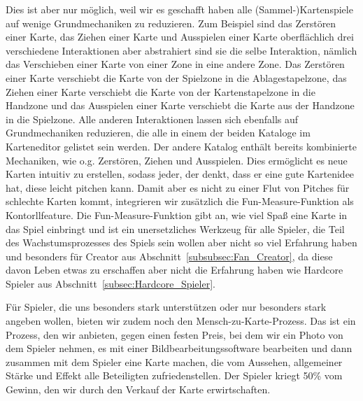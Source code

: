 \documentclass[fontsize=11, a4aper]{scrartcl}
\begin{document}
\noindent Dies ist aber nur möglich, weil wir es geschafft haben alle (Sammel-)Kartenspiele auf wenige Grundmechaniken zu reduzieren. Zum Beispiel sind das Zerstören einer Karte, das Ziehen einer Karte und Ausspielen einer Karte oberflächlich drei verschiedene Interaktionen aber abstrahiert sind sie die selbe Interaktion, nämlich das Verschieben einer Karte von einer Zone in eine andere Zone. Das Zerstören einer Karte verschiebt die Karte von der Spielzone in die Ablagestapelzone, das Ziehen einer Karte verschiebt die Karte von der Kartenstapelzone in die Handzone und das Ausspielen einer Karte verschiebt die Karte aus der Handzone in die Spielzone. Alle anderen Interaktionen lassen sich ebenfalls auf Grundmechaniken reduzieren, die alle in einem der beiden Kataloge im Karteneditor gelistet sein werden. Der andere Katalog enthält bereits kombinierte Mechaniken, wie o.g. Zerstören, Ziehen und Ausspielen. Dies ermöglicht es neue Karten intuitiv zu erstellen, sodass jeder, der denkt, dass er eine gute Kartenidee hat, diese leicht pitchen kann. Damit aber es nicht zu einer Flut von Pitches für schlechte Karten kommt, integrieren wir zusätzlich die \glqq Fun-Measure-Funktion\grqq{} als Kontorllfeature. Die \glqq Fun-Measure-Funktion\grqq{} gibt an, wie viel Spaß eine Karte in das Spiel einbringt und ist ein unersetzliches Werkzeug für alle Spieler, die Teil des Wachstumsprozesses des Spiels sein wollen aber nicht so viel Erfahrung haben und besonders für \glqq Creator\grqq{} aus Abschnitt~\ref{subsubsec:Fan_Creator}, da diese davon Leben etwas zu erschaffen aber nicht die Erfahrung haben wie \glqq Hardcore Spieler\grqq{} aus Abschnitt~\ref{subsec:Hardcore_Spieler}.\hfill\newline

\noindent Für Spieler, die uns besonders stark unterstützen oder nur besonders stark angeben wollen, bieten wir zudem noch den \glqq Mensch-zu-Karte-Prozess\grqq{}. Das ist ein Prozess, den wir anbieten, gegen einen festen Preis, bei dem wir ein Photo von dem Spieler nehmen, es mit einer Bildbearbeitungssoftware bearbeiten und dann zusammen mit dem Spieler eine Karte machen, die vom Aussehen, allgemeiner Stärke und Effekt alle Beteiligten zufriedenstellen. Der Spieler kriegt 50\% vom Gewinn, den wir durch den Verkauf der Karte erwirtschaften.\hfill\newline

\end{document}
